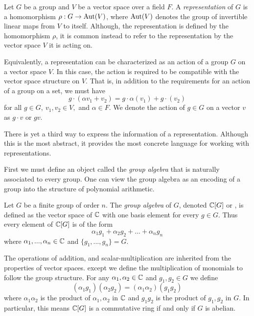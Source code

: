 \begin{definition}
    Let $G$ be a group and $V$ be a vector space over a field $F$. A \emph{representation} of $G$ is a homomorphism 
    $\rho : G \rightarrow \operatorname{Aut}(V)$, where $\operatorname{Aut}(V)$ denotes the group of invertible linear maps from $V$ to itself.  
    Although, the representation is defined by the homomorphism $\rho$, it is common instead to refer to the 
    representation by the vector space $V$ it is acting on.
    
    Equivalently, a representation can be characterized as an action of a group $G$ on a vector space $V$. In this 
    case, the action is required to be compatible with the vector space structure on $V$. That is, in addition to 
    the requirements for an action of a group on a set, we must have
\[g \cdot (\alpha v_1 + v_2) = g\cdot \alpha(v_1) + g\cdot(v_2)\]
    for all $g \in G,\ v_1, v_2 \in V,$ and $\alpha \in F$.
    We denote the action of $g \in G$ on a vector $v$ as $g \cdot v$ or $gv$.
\end{definition}


    There is yet a third way to express the information of a representation. Although this is the most abstract, it 
    provides the most concrete language for working with representations.
    
    First we must define an object called the \emph{group algebra} that is naturally associated to every group.
    One can view the group algebra as an encoding of a group into the structure of polynomial arithmetic.


\begin{definition}
    Let $G$ be a finite group of order $n$. The \emph{group algebra} of $G$, denoted $\mathbb{C}[G]$ or \CG, is defined as 
    the vector space of $\mathbb{C}$ with one basis element for every $g \in G$. Thus every element of $\mathbb{C}[G]$ is of the 
    form
    \[
        \alpha_1 g_1 + \alpha_2 g_2 + ... + \alpha_n g_n
    \]
    where $\alpha_1, ..., \alpha_n \in \mathbb{C}$ and $\{g_1, ..., g_n\} = G$.
    
    The operations of addition, and scalar-multiplication are inherited from the properties of vector spaces.  
    except we define the multiplication of monomials to follow the group structure.
    For any $\alpha_1, \alpha_2 \in \mathbb{C}$ and $g_1, g_2 \in G$ we define
    \[
        (\alpha_1g_1)(\alpha_2g_2) = (\alpha_1\alpha_2)(g_1g_2)
    \]
    where $\alpha_1\alpha_2$ is the product of $\alpha_1, \alpha_2$ in $\mathbb{C}$ and $g_1 g_2$ is the product of $g_1, 
    g_2$ in $G$. In particular, this means $\mathbb{C}[G]$ is a commutative ring if and only if $G$ is abelian.
\end{definition}

